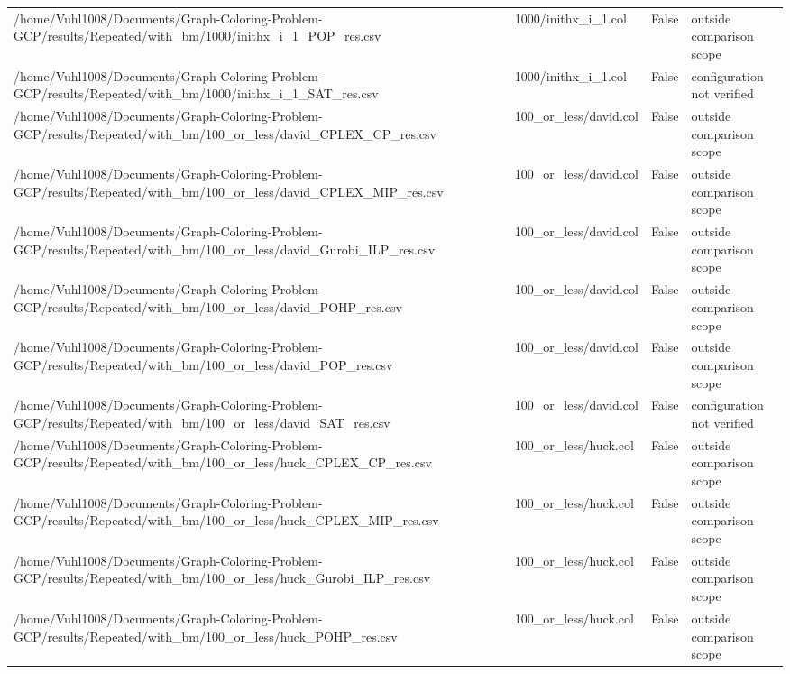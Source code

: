 \begin{table}[htbp]
\begin{tabular}{llll}
/home/Vuhl1008/Documents/Graph-Coloring-Problem-GCP/results/Repeated/with\_bm/1000/inithx\_i\_1\_POP\_res.csv & 1000/inithx\_i\_1.col & False & outside comparison scope \\
/home/Vuhl1008/Documents/Graph-Coloring-Problem-GCP/results/Repeated/with\_bm/1000/inithx\_i\_1\_SAT\_res.csv & 1000/inithx\_i\_1.col & False & configuration not verified \\
/home/Vuhl1008/Documents/Graph-Coloring-Problem-GCP/results/Repeated/with\_bm/100\_or\_less/david\_CPLEX\_CP\_res.csv & 100\_or\_less/david.col & False & outside comparison scope \\
/home/Vuhl1008/Documents/Graph-Coloring-Problem-GCP/results/Repeated/with\_bm/100\_or\_less/david\_CPLEX\_MIP\_res.csv & 100\_or\_less/david.col & False & outside comparison scope \\
/home/Vuhl1008/Documents/Graph-Coloring-Problem-GCP/results/Repeated/with\_bm/100\_or\_less/david\_Gurobi\_ILP\_res.csv & 100\_or\_less/david.col & False & outside comparison scope \\
/home/Vuhl1008/Documents/Graph-Coloring-Problem-GCP/results/Repeated/with\_bm/100\_or\_less/david\_POHP\_res.csv & 100\_or\_less/david.col & False & outside comparison scope \\
/home/Vuhl1008/Documents/Graph-Coloring-Problem-GCP/results/Repeated/with\_bm/100\_or\_less/david\_POP\_res.csv & 100\_or\_less/david.col & False & outside comparison scope \\
/home/Vuhl1008/Documents/Graph-Coloring-Problem-GCP/results/Repeated/with\_bm/100\_or\_less/david\_SAT\_res.csv & 100\_or\_less/david.col & False & configuration not verified \\
/home/Vuhl1008/Documents/Graph-Coloring-Problem-GCP/results/Repeated/with\_bm/100\_or\_less/huck\_CPLEX\_CP\_res.csv & 100\_or\_less/huck.col & False & outside comparison scope \\
/home/Vuhl1008/Documents/Graph-Coloring-Problem-GCP/results/Repeated/with\_bm/100\_or\_less/huck\_CPLEX\_MIP\_res.csv & 100\_or\_less/huck.col & False & outside comparison scope \\
/home/Vuhl1008/Documents/Graph-Coloring-Problem-GCP/results/Repeated/with\_bm/100\_or\_less/huck\_Gurobi\_ILP\_res.csv & 100\_or\_less/huck.col & False & outside comparison scope \\
/home/Vuhl1008/Documents/Graph-Coloring-Problem-GCP/results/Repeated/with\_bm/100\_or\_less/huck\_POHP\_res.csv & 100\_or\_less/huck.col & False & outside comparison scope \\

\end{tabular}
\end{table}

